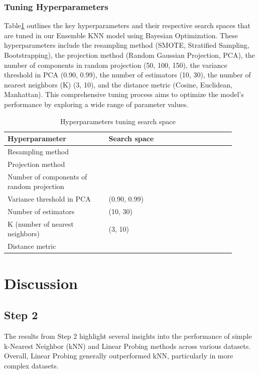 \documentclass[a4paper]{article}
\begin{document}
\subsubsection{Tuning Hyperparameters}
Table\ref{tab:hyperparameters} outlines the key hyperparameters and their respective search spaces that are tuned in our Ensemble KNN model using Bayesian Optimization. These hyperparameters include the resampling method (SMOTE, Stratified Sampling, Bootstrapping), the projection method (Random Gaussian Projection, PCA), the number of components in random projection (50, 100, 150), the variance threshold in PCA (0.90, 0.99), the number of estimators (10, 30), the number of nearest neighbors (K) (3, 10), and the distance metric (Cosine, Euclidean, Manhattan). This comprehensive tuning process aims to optimize the model's performance by exploring a wide range of parameter values.

\begin{table}[ht]
    \caption{Hyperparameters tuning search space}
    \label{tab:hyperparameters}
    \centering
    \begin{tabular}{>{\raggedright}m{0.4\linewidth} >{\raggedright\arraybackslash}m{0.5\linewidth}}
    \hline\hline
    \textbf{Hyperparameter} & \textbf{Search space} \\
    \hline
    Resampling method & [SMOTE, Stratified, Bootstrapping] \\
    \hline
    Projection method & [Random Gaussian Projection, PCA] \\
    \hline
    Number of components of random projection & [50, 100, 150] \\
    \hline
    Variance threshold in PCA & (0.90, 0.99) \\
    \hline
    Number of estimators & (10, 30) \\
    \hline
    K (number of nearest neighbors) & (3, 10) \\
    \hline
    Distance metric & [Cosine, Euclidean, Manhattan] \\
    \hline
    \end{tabular}
\end{table}




\section{Discussion}
\subsection{Step 2}
The results from Step 2 highlight several insights into the performance of simple k-Nearest Neighbor (kNN) and Linear Probing methods across various datasets. Overall, Linear Probing generally outperformed kNN, particularly in more complex datasets.
\end{document}
